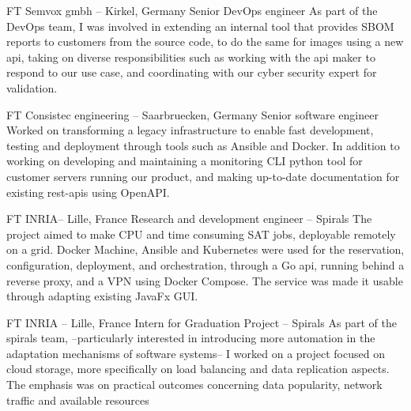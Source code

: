 \documentclass[10pt]{article} %
\begin{document}
\begin{paracol}{2}


{FT} %
{Semvox gmbh -- Kirkel, Germany} %
{Senior DevOps engineer} %
{As part of the DevOps team, I was involved in extending an internal tool that provides SBOM reports to customers from the source code, to do the same for images using a new api, taking on diverse responsibilities such as working with the api maker to respond to our use case, and coordinating with our cyber security expert for validation.} %


{FT} %
{Consistec engineering -- Saarbruecken, Germany} %
{Senior software engineer} %
{Worked on transforming a legacy infrastructure to enable fast development, testing and deployment through tools such as Ansible and Docker. In addition to working on developing and maintaining a monitoring CLI python tool for customer servers running our product, and making up-to-date documentation for existing rest-apis using OpenAPI. } %


{FT} %
{INRIA-- Lille, France} %
{Research and development engineer -- Spirals} %
{The project aimed to make CPU and time consuming SAT jobs, deployable remotely on a grid. Docker Machine, Ansible and Kubernetes were used for the reservation, configuration, deployment, and orchestration, through a Go api, running behind a reverse proxy, and a VPN using Docker Compose. The service was made it usable through adapting existing JavaFx GUI.} %


\vspace{-\baselineskip}\medskip %

{FT} %
{INRIA -- Lille, France} %
{Intern for Graduation Project -- Spirals} %
{As part of the spirals team, --particularly interested in introducing more automation in the adaptation mechanisms of software systems-- I worked on a project focused on cloud storage, more specifically on load balancing and data replication aspects. The emphasis was on practical outcomes concerning data popularity, network traffic and available resources} %


\end{paracol}
\end{document}
